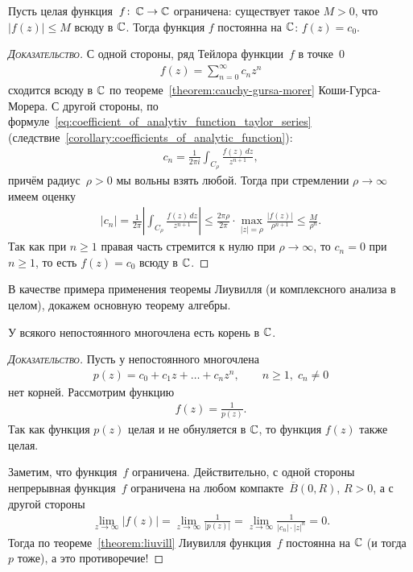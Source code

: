 \documentclass[../complex-analysis.tex]{subfiles}
\begin{document}
\begin{thm}[Лиувилля]
 \label{theorem:liuvill}
 Пусть целая функция~$ f\colon\,\mathbb{C}\to\mathbb{C} $ ограничена: существует такое $ M > 0 $, что $ \left| f(z) \right| \leqslant M $ всюду в $ \mathbb{C} $. Тогда функция $ f $ постоянна на $ \mathbb{C} $: $ f(z) = c_0 $.
\end{thm}
\begin{proof}[\normalfont\textsc{Доказательство}]
 С одной стороны, ряд Тейлора функции~$ f $ в точке~$ 0 $
 \begin{align*}
  f(z) = \sum_{n=0}^{\infty} c_n z^{n}
 \end{align*} сходится всюду в $ \mathbb{C} $ по теореме~\ref{theorem:cauchy-gursa-morer} Коши-Гурса-Морера. С другой стороны, по формуле~\eqref{eq:coefficient_of_analytiv_function_taylor_series} (следствие~\ref{corollary:coefficients_of_analytic_function}):
 \begin{align*}
  c_n = \frac{1}{2\pi i} \int_{C_\rho} \frac{f(z)\,dz}{z^{n+1}},
 \end{align*} причём радиус~$ \rho > 0 $ мы вольны взять любой. Тогда при стремлении $ \rho \to \infty $ имеем оценку
 \begin{align*}
  \left| c_n \right| = \frac{1}{2\pi} \left| \int_{C_\rho} \frac{f(z)\,dz}{z^{n+1}}  \right|\leqslant \frac{2\pi\rho}{2\pi} \cdot \max_{\left| z \right|=\rho} \frac{\left| f(z) \right|}{\rho^{n+1}} \leqslant \frac{M}{\rho^{n}}.
 \end{align*} Так как при $ n \geqslant 1 $ правая часть стремится к нулю при $ \rho \to \infty $, то $ c_n = 0 $ при $ n \geqslant 1 $, то есть $ f(z) = c_0 $ всюду в $ \mathbb{C} $.
\end{proof}

В качестве примера применения теоремы Лиувилля (и комплексного анализа в целом), докажем основную теорему алгебры.

\begin{thm}
 У всякого непостоянного многочлена есть корень в $ \mathbb{C} $.
\end{thm}
\begin{proof}[\normalfont\textsc{Доказательство}]
 Пусть у непостоянного многочлена
 \begin{align*}
  p(z) = c_0 + c_1 z + \ldots + c_n z^{n}, \qquad n \geqslant 1,\; c_n \neq 0
 \end{align*}
 нет корней. Рассмотрим функцию
 \begin{align*}
  f(z) = \frac{1}{p(z)}.
 \end{align*} Так как функция $ p(z) $ целая и не обнуляется в $ \mathbb{C} $, то функция $ f(z) $ также целая.

 Заметим, что функция~$ f $ ограничена. Действительно, с одной стороны непрерывная функция~$ f $ ограничена на любом компакте~$ \overline B(0, R) $, $ R > 0 $, а с другой стороны
 \begin{align*}
  \lim_{z \to \infty} \left| f(z) \right| = \lim_{z \to \infty} \frac{1}{\left| p(z) \right|} = \lim_{z \to \infty} \frac{1}{\left| c_n \right| \cdot \left| z \right|^{n}} = 0.
 \end{align*} Тогда по теореме~\ref{theorem:liuvill} Лиувилля функция~$ f $ постоянна на $ \mathbb{C} $ (и тогда $ p $ тоже), а это противоречие!
\end{proof}
\end{document}
